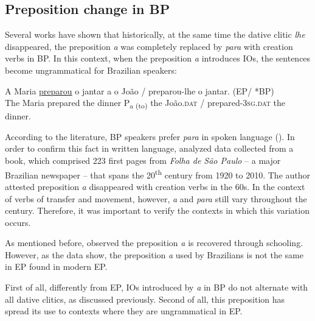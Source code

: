 \documentclass[output=paper,colorlinks,citecolor=brown]{./langscibook}
\begin{document}
\subsection{Preposition change in BP}\label{sec:calindro:2.1}

Several works have shown that historically, at the same time the dative clitic \textit{lhe} disappeared, the preposition \textit{a} was completely replaced by \textit{para} with creation verbs in BP. In this context, when the preposition \textit{a} introduces IOs, the sentences become ungrammatical for Brazilian speakers:

\ea%
    \label{ex:calindro:11}
    \gll A   Maria \underline{preparou} o jantar     a o {João} / preparou-lhe o jantar.   \hspace*{21em}   (EP/ *BP) \\
    The Maria prepared  the dinner  P{\textsubscript{a (to)}} the João.\textsc{dat} / prepared-\textsc{3sg.dat} the dinner. \\
    \z

According to the literature, BP speakers prefer \textit{para} in spoken language (\citealt{TorresMoraisBerlinck2007}). In order to confirm this fact in written language, \citet{Calindro2015} analyzed data collected from a book, which comprised 223 first pages from \textit{Folha de São Paulo} – a major Brazilian newspaper – that spans the 20\textsuperscript{th} century from 1920 to 2010. The author attested preposition \textit{a} disappeared with creation verbs in the 60s. In the context of verbs of transfer and movement, however, \textit{a} and \textit{para} still vary throughout the century. Therefore, it was important to verify the contexts in which this variation occurs.

As mentioned before, \citet{Kato2005} observed the preposition \textit{a} is recovered through schooling. However, as the data show, the preposition \textit{a} used by Brazilians is not the same in EP found in modern EP. 

First of all, differently from EP, IOs introduced by \textit{a} in BP do not alternate with all dative clitics, as discussed previously. Second of all, this preposition has spread its use to contexts where they are ungrammatical in EP.
\end{document}
